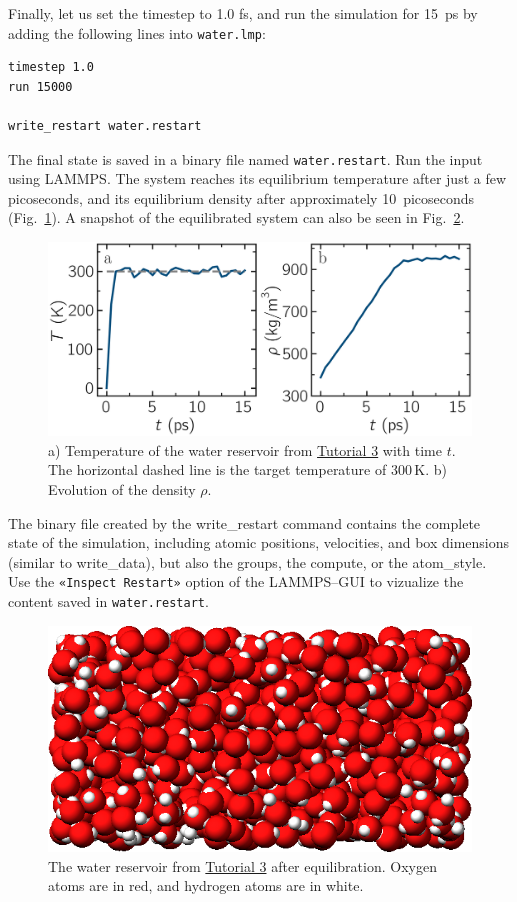 \documentclass[9pt,tutorial]{livecoms}
\newcommand{\lmpcmdnote}[1]{\hspace{0pt}\colorbox{note_listing}{\textcolor{command}{\small{#1}}}\hspace{0pt}} %
\newcommand{\flecmd}[1]{\textcolor{command}{\texttt{#1}}} %
\newcommand{\guicmd}[1]{\textcolor{command}{\texttt{«#1»}}} %
\begin{document}
Finally, let us set the timestep to 1.0 fs, and run the simulation for 15~ps by
adding the following lines into \flecmd{water.lmp}:
\begin{lstlisting}
timestep 1.0
run 15000

write_restart water.restart
\end{lstlisting}
The final state is saved in a binary file named \flecmd{water.restart}.
Run the input using LAMMPS.  The system reaches its equilibrium temperature
after just a few picoseconds, and its equilibrium density after approximately
10~picoseconds (Fig.~\ref{fig:PEG-density}).  A snapshot of the equilibrated
system can also be seen in Fig.~\ref{fig:PEG-water}.

\begin{figure}
\centering
\includegraphics[width=\linewidth]{PEG-density}
\caption{a) Temperature of the water reservoir from
\hyperref[all-atom-label]{Tutorial 3} with time $t$.  The horizontal dashed line is
the target temperature of 300\,K.  b) Evolution of the density $\rho$.}
\label{fig:PEG-density}
\end{figure}

\begin{note}
The binary file created by the \lmpcmdnote{write\_restart} command contains the
complete state of the simulation, including atomic positions, velocities, and
box dimensions (similar to \lmpcmdnote{write\_data}), but also the groups,
the compute, or the \lmpcmdnote{atom\_style}.  Use the \guicmd{Inspect Restart}
option of the LAMMPS--GUI to vizualize the content saved in \flecmd{water.restart}.
\end{note}

\begin{figure}
\centering
\includegraphics[width=\linewidth]{PEG-water}
\caption{The water reservoir from \hyperref[all-atom-label]{Tutorial 3}
after equilibration.  Oxygen atoms are in red, and hydrogen atoms are in white.}
\label{fig:PEG-water}
\end{figure}
\end{document}
